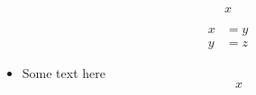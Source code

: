 \[
x
\]

\[
\begin{split}
x &= y \\
y &= z
\end{split}
\]

\begin{itemize}
\item Some text here
\[
x
\]
\end{itemize}
